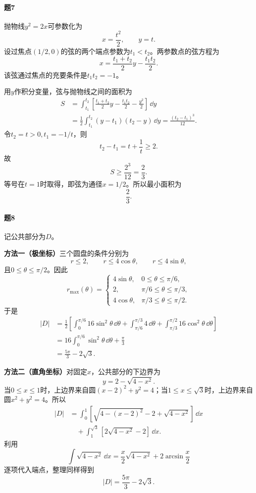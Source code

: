 \paragraph{题7}
\begin{xsolution}
抛物线$y^2=2x$可参数化为
\[
 x=\frac{t^2}{2},\qquad y=t.
\]
设过焦点$(1/2,0)$的弦的两个端点参数为$t_1<t_2$。两参数点的弦方程为
\[
 x=\frac{t_1+t_2}{2}y-\frac{t_1t_2}{2}.
\]
该弦通过焦点的充要条件是$t_1t_2=-1$。

用$y$作积分变量，弦与抛物线之间的面积为
\begin{align*}
S&=\int_{t_1}^{t_2}\left[
\frac{t_1+t_2}{2}y-\frac{t_1t_2}{2}-\frac{y^2}{2}
\right]\,\dd y\\
&=\frac12\int_{t_1}^{t_2}(y-t_1)(t_2-y)\,\dd y
=\frac{(t_2-t_1)^3}{12}.
\end{align*}
令$t_2=t>0,t_1=-1/t$，则
\[
 t_2-t_1=t+\frac1t\ge2.
\]
故
\[
 S\ge\frac{2^3}{12}=\frac23.
\]
等号在$t=1$时取得，即弦为通径$x=1/2$。所以最小面积为
\[
 \boxed{\frac23}.
\]
\end{xsolution}

\paragraph{题8}
\begin{xsolution}
记公共部分为$D$。

\textbf{方法一（极坐标）}\quad 三个圆盘的条件分别为
\[
 r\le2,\qquad r\le4\cos\theta,\qquad r\le4\sin\theta,
\]
且$0\le\theta\le\pi/2$。因此
\[
 r_{\max}(\theta)=
 \begin{cases}
 4\sin\theta,&0\le\theta\le\pi/6,\\
 2,&\pi/6\le\theta\le\pi/3,\\
 4\cos\theta,&\pi/3\le\theta\le\pi/2.
 \end{cases}
\]
于是
\begin{align*}
|D|
&=\frac12\left[
\int_0^{\pi/6}16\sin^2\theta\,\dd\theta
+\int_{\pi/6}^{\pi/3}4\,\dd\theta
+\int_{\pi/3}^{\pi/2}16\cos^2\theta\,\dd\theta
\right]\\
&=16\int_0^{\pi/6}\sin^2\theta\,\dd\theta+\frac\pi3\\
&=\frac{5\pi}{3}-2\sqrt3.
\end{align*}

\textbf{方法二（直角坐标）}\quad 对固定$x$，公共部分的下边界为
\[
 y=2-\sqrt{4-x^2}.
\]
当$0\le x\le1$时，上边界来自圆$(x-2)^2+y^2=4$；当$1\le x\le\sqrt3$时，上边界来自圆$x^2+y^2=4$。所以
\begin{align*}
|D|
&=\int_0^1\left[\sqrt{4-(x-2)^2}-2+\sqrt{4-x^2}\right]\,\dd x\\
&\quad+\int_1^{\sqrt3}\left[2\sqrt{4-x^2}-2\right]\,\dd x.
\end{align*}
利用
\[
 \int\sqrt{4-x^2}\,\dd x
 =\frac x2\sqrt{4-x^2}+2\arcsin\frac x2
\]
逐项代入端点，整理同样得到
\[
 |D|=\boxed{\frac{5\pi}{3}-2\sqrt3}.
\]
\end{xsolution}

